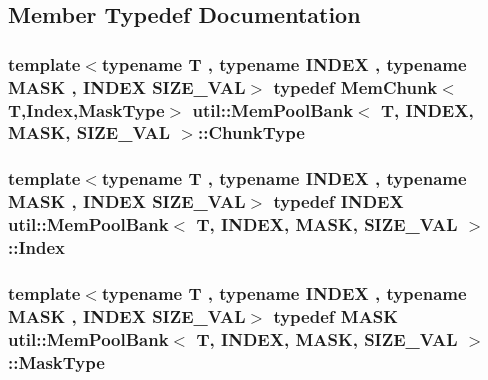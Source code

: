 \subsection{Member Typedef Documentation}
\hypertarget{structutil_1_1MemPoolBank_ae0486bc8380e8aea5a8413e20ae31701}{
\subsubsection[{Chunk\-Type}]{\setlength{\rightskip}{0pt plus 5cm}template$<$typename T , typename I\-N\-D\-E\-X , typename M\-A\-S\-K , I\-N\-D\-E\-X S\-I\-Z\-E\-\_\-\-V\-A\-L$>$ typedef {\bf Mem\-Chunk}$<$T,{\bf Index},{\bf Mask\-Type}$>$ {\bf util\-::\-Mem\-Pool\-Bank}$<$ T, I\-N\-D\-E\-X, M\-A\-S\-K, S\-I\-Z\-E\-\_\-\-V\-A\-L $>$\-::{\bf Chunk\-Type}}}\label{structutil_1_1MemPoolBank_ae0486bc8380e8aea5a8413e20ae31701}
\hypertarget{structutil_1_1MemPoolBank_a1acaedbb0b2b5d18faa451597e54d61d}{
\subsubsection[{Index}]{\setlength{\rightskip}{0pt plus 5cm}template$<$typename T , typename I\-N\-D\-E\-X , typename M\-A\-S\-K , I\-N\-D\-E\-X S\-I\-Z\-E\-\_\-\-V\-A\-L$>$ typedef I\-N\-D\-E\-X {\bf util\-::\-Mem\-Pool\-Bank}$<$ T, I\-N\-D\-E\-X, M\-A\-S\-K, S\-I\-Z\-E\-\_\-\-V\-A\-L $>$\-::{\bf Index}}}\label{structutil_1_1MemPoolBank_a1acaedbb0b2b5d18faa451597e54d61d}
\hypertarget{structutil_1_1MemPoolBank_aef12a55d338543b98354e53c5137e7ed}{
\subsubsection[{Mask\-Type}]{\setlength{\rightskip}{0pt plus 5cm}template$<$typename T , typename I\-N\-D\-E\-X , typename M\-A\-S\-K , I\-N\-D\-E\-X S\-I\-Z\-E\-\_\-\-V\-A\-L$>$ typedef M\-A\-S\-K {\bf util\-::\-Mem\-Pool\-Bank}$<$ T, I\-N\-D\-E\-X, M\-A\-S\-K, S\-I\-Z\-E\-\_\-\-V\-A\-L $>$\-::{\bf Mask\-Type}}}\label{structutil_1_1MemPoolBank_aef12a55d338543b98354e53c5137e7ed}
